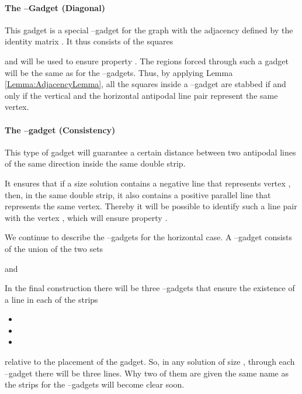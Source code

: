 \documentclass[12pt]{article}
\begin{document}
\paragraph{The --Gadget (Diagonal)}
This gadget is a special --gadget for the graph with the adjacency defined by the identity matrix . It thus consists of the squares

and will be used to ensure property . The regions forced through such a gadget will be the same as for the --gadgets. Thus, by applying Lemma \ref{Lemma:AdjacencyLemma}, all the squares inside a --gadget are stabbed if and only if the vertical and the horizontal antipodal line pair represent the same vertex.

\paragraph{The --gadget (Consistency)}
This type of gadget will guarantee a certain distance between two antipodal lines of the same direction inside the same double strip. 

It ensures that if a size  solution contains a negative line  that represents vertex , then, in the same double strip, it also contains a positive parallel line  that represents the same vertex. Thereby it will be possible to identify such a line pair with the vertex , which will ensure property .

We continue to describe the --gadgets for the horizontal case. A --gadget consists of the union of the two sets

and

In the final construction there will be three --gadgets that ensure the existence of a line in each of the strips
\begin{itemize}
	\item  
	\item 
	\item 
\end{itemize}
relative to the placement of the gadget. So, in any solution of size , through each --gadget there will be three lines. Why two of them are given the same name as the strips for the --gadgets will become clear soon.
\end{document}

